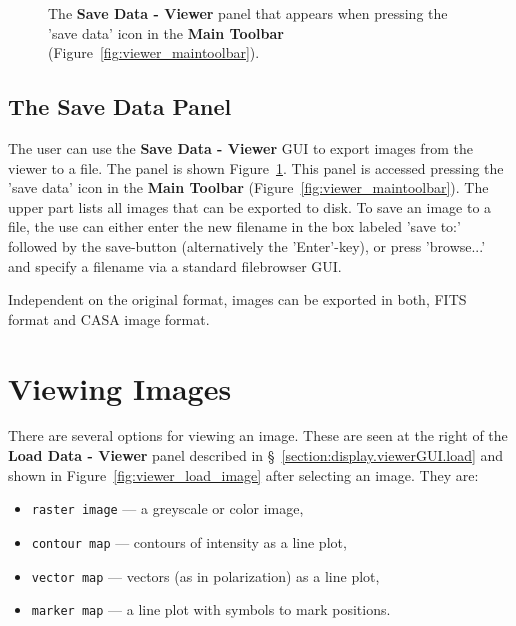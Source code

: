 \begin{figure}[h!]
\begin{center}
\caption{\label{fig:viewer_save} The {\bf Save Data - Viewer} panel
that appears when pressing the 'save data' icon in the {\bf Main Toolbar}
(Figure~\ref{fig:viewer_maintoolbar}).} 
\hrulefill
\end{center}
\end{figure}
\subsection{The Save Data Panel}
\label{section:display.viewerGUI.save}
The user can use the {\bf Save Data - Viewer} GUI to export images from the
viewer to a file. The panel is shown Figure~\ref{fig:viewer_save}.
This panel is accessed pressing the 'save data' icon in the 
{\bf Main Toolbar} (Figure~\ref{fig:viewer_maintoolbar}).
The upper part lists all images that can be exported to disk.
To save an image to a file, the use can either enter the new filename in the
box labeled 'save to:' followed by the save-button (alternatively the
'Enter'-key), or press 'browse...' and specify a filename via a
standard filebrowser GUI.

Independent on the original format, images can be exported in both,
FITS format and CASA image format.
 
\section{Viewing Images}
\label{section:display.image}

There are several options for viewing an image.  These are seen
at the right of the {\bf Load Data - Viewer} panel 
described in \S~\ref{section:display.viewerGUI.load} and shown in 
Figure~\ref{fig:viewer_load_image} after selecting an image.  They are:
\begin{itemize}
   \item {\tt raster image} --- a greyscale or color image,
   \item {\tt contour map} --- contours of intensity as a line plot,
   \item {\tt vector map} --- vectors (as in polarization) as a line plot,
   \item {\tt marker map} --- a line plot with symbols to mark positions.
\end{itemize}

